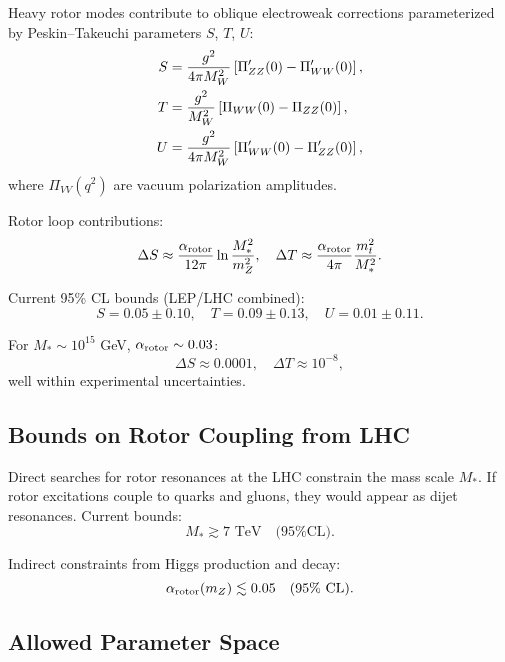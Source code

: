 \documentclass[11pt,a4paper]{article}
\numberwithin{equation}{section}
\theoremstyle{plain}
\theoremstyle{definition}
\theoremstyle{remark}
\begin{document}
Heavy rotor modes contribute to oblique electroweak corrections parameterized by Peskin--Takeuchi parameters $S$, $T$, $U$:
\begin{align}
S &= \frac{g^2}{4\pi M_W^2}\left[\Pi_{ZZ}'(0) - \Pi_{WW}'(0)\right], \notag\\
T &= \frac{g^2}{M_W^2}\left[\Pi_{WW}(0) - \Pi_{ZZ}(0)\right], \notag\\
U &= \frac{g^2}{4\pi M_W^2}\left[\Pi_{WW}'(0) - \Pi_{ZZ}'(0)\right],
\label{eq:STU}
\end{align}
where $\Pi_{VV}(q^2)$ are vacuum polarization amplitudes.

Rotor loop contributions:
\begin{equation}
\Delta S \approx \frac{\alpha_{\rm rotor}}{12\pi}\ln\frac{M_*^2}{m_Z^2}, \quad \Delta T \approx \frac{\alpha_{\rm rotor}}{4\pi}\frac{m_t^2}{M_*^2}.
\label{eq:STU-rotor}
\end{equation}

Current 95\% CL bounds (LEP/LHC combined):
\begin{equation}
S = 0.05\pm 0.10, \quad T = 0.09\pm 0.13, \quad U = 0.01\pm 0.11.
\label{eq:STU-exp}
\end{equation}

For $M_*\sim 10^{15}$ GeV, $\alpha_{\rm rotor}\sim 0.03$:
\begin{equation}
\Delta S \approx 0.0001, \quad \Delta T \approx 10^{-8},
\label{eq:STU-rotor-value}
\end{equation}
well within experimental uncertainties.

\subsection{Bounds on Rotor Coupling from LHC}

Direct searches for rotor resonances at the LHC constrain the mass scale $M_*$. If rotor excitations couple to quarks and gluons, they would appear as dijet resonances. Current bounds:
\begin{equation}
M_* \gtrsim 7\text{ TeV} \quad\text{(95\% CL)}.
\label{eq:M-star-LHC}
\end{equation}

Indirect constraints from Higgs production and decay:
\begin{equation}
\alpha_{\rm rotor}(m_Z) \lesssim 0.05 \quad\text{(95\% CL)}.
\label{eq:alpha-LHC}
\end{equation}

\subsection{Allowed Parameter Space}
\end{document}
